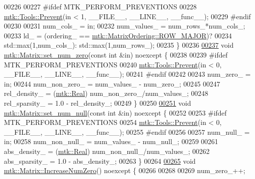 \begin{DoxyCode}
00226 
00227 \textcolor{preprocessor}{  #ifdef MTK\_PERFORM\_PREVENTIONS}
00228   \hyperlink{classmtk_1_1Tools_a332324c6f25e66be9dff48c5987a3b9f}{mtk::Tools::Prevent}(in < 1, \_\_FILE\_\_, \_\_LINE\_\_, \_\_func\_\_);
00229 \textcolor{preprocessor}{  #endif}
00230 
00231   num\_cols\_ = in;
00232   num\_values\_ = num\_rows\_*num\_cols\_;
00233   ld\_ = (ordering\_ == \hyperlink{namespacemtk_ga622801bd9f912d0f976c3e383f5f581ca21541962976d7709c26e9cd8385bd648}{mtk::MatrixOrdering::ROW\_MAJOR})?
00234     std::max(1,num\_cols\_): std::max(1,num\_rows\_);
00235 \}
00236 
\hypertarget{mtk__matrix_8cc_source_l00237}{}\hyperlink{classmtk_1_1Matrix_a6eb14709692df59573548ffd8cf67198}{00237} \textcolor{keywordtype}{void} \hyperlink{classmtk_1_1Matrix_a6eb14709692df59573548ffd8cf67198}{mtk::Matrix::set\_num\_zero}(\textcolor{keyword}{const} \textcolor{keywordtype}{int} &in) noexcept \{
00238 
00239 \textcolor{preprocessor}{  #ifdef MTK\_PERFORM\_PREVENTIONS}
00240   \hyperlink{classmtk_1_1Tools_a332324c6f25e66be9dff48c5987a3b9f}{mtk::Tools::Prevent}(in < 0, \_\_FILE\_\_, \_\_LINE\_\_, \_\_func\_\_);
00241 \textcolor{preprocessor}{  #endif}
00242 
00243   num\_zero\_ = in;
00244   num\_non\_zero\_ = num\_values\_ - num\_zero\_;
00245 
00247   rel\_density\_ = (\hyperlink{group__c01-roots_gac080bbbf5cbb5502c9f00405f894857d}{mtk::Real}) num\_non\_zero\_/num\_values\_;
00248   rel\_sparsity\_ = 1.0 - rel\_density\_;
00249 \}
00250 
\hypertarget{mtk__matrix_8cc_source_l00251}{}\hyperlink{classmtk_1_1Matrix_a61dba12c767f98cda5343b4b16bbbe77}{00251} \textcolor{keywordtype}{void} \hyperlink{classmtk_1_1Matrix_a61dba12c767f98cda5343b4b16bbbe77}{mtk::Matrix::set\_num\_null}(\textcolor{keyword}{const} \textcolor{keywordtype}{int} &in) noexcept \{
00252 
00253 \textcolor{preprocessor}{  #ifdef MTK\_PERFORM\_PREVENTIONS}
00254   \hyperlink{classmtk_1_1Tools_a332324c6f25e66be9dff48c5987a3b9f}{mtk::Tools::Prevent}(in < 0, \_\_FILE\_\_, \_\_LINE\_\_, \_\_func\_\_);
00255 \textcolor{preprocessor}{  #endif}
00256 
00257   num\_null\_ = in;
00258   num\_non\_null\_ = num\_values\_ - num\_null\_;
00259 
00261   abs\_density\_ = (\hyperlink{group__c01-roots_gac080bbbf5cbb5502c9f00405f894857d}{mtk::Real}) num\_non\_null\_/num\_values\_;
00262   abs\_sparsity\_ = 1.0 - abs\_density\_;
00263 \}
00264 
\hypertarget{mtk__matrix_8cc_source_l00265}{}\hyperlink{classmtk_1_1Matrix_ace7cb5c31d0de66b8f9c63cd542c9e63}{00265} \textcolor{keywordtype}{void} \hyperlink{classmtk_1_1Matrix_ace7cb5c31d0de66b8f9c63cd542c9e63}{mtk::Matrix::IncreaseNumZero}() noexcept \{
00266 
00268 
00269   num\_zero\_++;

\end{DoxyCode}
